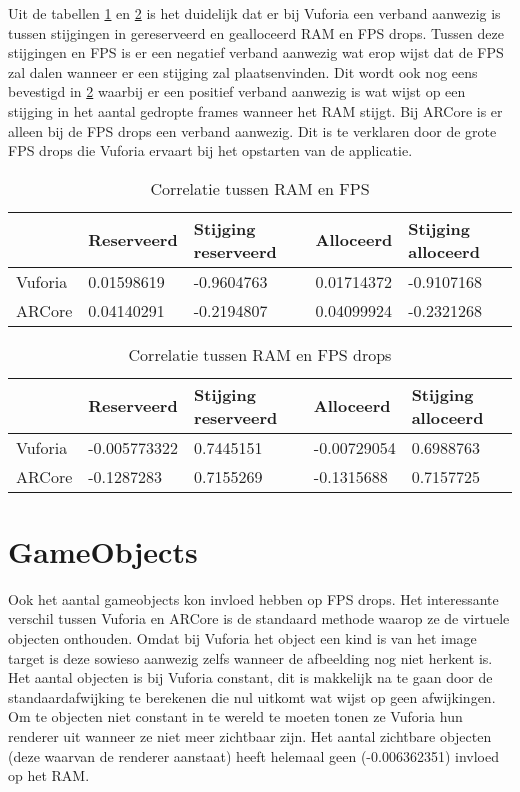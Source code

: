 Uit de tabellen \ref{tbl:ramfps} en \ref{tbl:ramdropfps} is het duidelijk dat er bij Vuforia een verband aanwezig is tussen stijgingen in gereserveerd en gealloceerd RAM en FPS drops. Tussen deze stijgingen en FPS is er een negatief verband aanwezig wat erop wijst dat de FPS zal dalen wanneer er een stijging zal plaatsenvinden. Dit wordt ook nog eens bevestigd in \ref{tbl:ramdropfps} waarbij er een positief verband aanwezig is wat wijst op een stijging in het aantal gedropte frames wanneer het RAM stijgt. Bij ARCore is er alleen bij de FPS drops een verband aanwezig. Dit is te verklaren door de grote FPS drops die Vuforia ervaart bij het opstarten van de applicatie.
\begin{table}[]
    \begin{tabular}{l|ll|l|l}
        & Reserveerd & Stijging reserveerd & Alloceerd  & Stijging alloceerd \\ \hline
        Vuforia & 0.01598619 & -0.9604763          & 0.01714372 & -0.9107168         \\
        ARCore  & 0.04140291 & -0.2194807          & 0.04099924 & -0.2321268        
    \end{tabular}
\caption{Correlatie tussen RAM en FPS}\label{tbl:ramfps}
\end{table}

\begin{table}[]
    \begin{tabular}{l|ll|l|l}
        & Reserveerd   & Stijging reserveerd & Alloceerd   & Stijging alloceerd \\ \hline
        Vuforia & -0.005773322 & 0.7445151           & -0.00729054 & 0.6988763          \\
        ARCore  & -0.1287283   & 0.7155269           & -0.1315688  & 0.7157725         
    \end{tabular}
\caption{Correlatie tussen RAM en FPS drops}\label{tbl:ramdropfps}
\end{table}

\section{GameObjects}
Ook het aantal gameobjects kon invloed hebben op FPS drops. Het interessante verschil tussen Vuforia en ARCore is de standaard methode waarop ze de virtuele objecten onthouden. Omdat bij Vuforia het object een kind is van het image target is deze sowieso aanwezig zelfs wanneer de afbeelding nog niet herkent is. Het aantal objecten is bij Vuforia constant, dit is makkelijk na te gaan door de standaardafwijking te berekenen die nul uitkomt wat wijst op geen afwijkingen. Om te objecten niet constant in te wereld te moeten tonen ze Vuforia hun renderer uit wanneer ze niet meer zichtbaar zijn. Het aantal zichtbare objecten (deze waarvan de renderer aanstaat) heeft helemaal geen (-0.006362351) invloed op het RAM.

